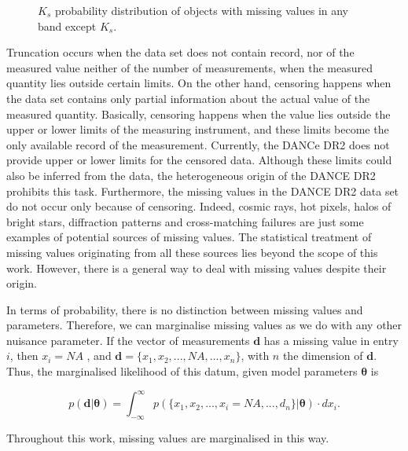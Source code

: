 \begin{figure}[ht!]
\begin{center}
\caption{$K_s$ probability distribution of objects with missing values in any band except $K_s$.}
\label{fig:NAsKs}
\end{center}
\end{figure}



Truncation occurs when the data set does not contain record, nor of the measured value neither of the number of measurements, when the measured quantity lies outside certain limits. On the other hand,  censoring happens when the data set contains only partial information about the actual value of the measured quantity. Basically,  censoring happens when the value lies outside the upper or lower limits of the measuring instrument, and these limits become the only available record of the measurement. Currently, the DANCe DR2 does not provide upper or lower limits for the censored data. Although these limits could also be inferred from the data, the  heterogeneous origin of the DANCE DR2 prohibits this task. Furthermore, the missing values in the DANCE DR2 data set do not occur only because of censoring. Indeed, cosmic rays, hot pixels, halos of bright stars, diffraction patterns and cross-matching failures are just some examples of potential sources of missing values. The statistical treatment of missing values originating from all these sources lies beyond the scope of this work. However, there is a general way to deal with missing values despite their origin.

In terms of probability, there is no distinction between missing values and parameters. Therefore, we can marginalise missing values as we do with any other nuisance parameter. If the vector of measurements $\mathbf{d}$ has a missing value in entry $i$, then $x_{i} = NA$ , and $\mathbf{d}=\{x_1,x_2,...,NA,...,x_n\}$, with $n$ the dimension of $\mathbf{d}$. Thus, the marginalised likelihood of this datum, given model parameters $\mathbf{\theta}$ is

\begin{equation}
\label{eq:marginalmiss}
p(\mathbf{d}|\mathbf{\theta})= \int_{-\infty}^{\infty} p(\{x_1,x_2,...,x_{i}= NA,...,d_n\}|\mathbf{\theta})\cdot dx_{i}.
\end{equation}

Throughout this work, missing values are marginalised in this way.


